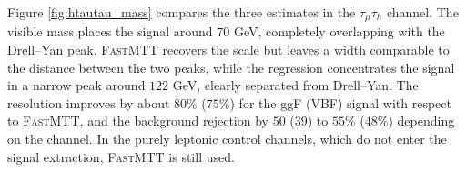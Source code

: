 Figure \ref{fig:htautau_mass} compares the three estimates in the $\tau_\mu\tau_h$ channel. The visible mass places the signal around $70$ GeV, completely overlapping with the Drell--Yan peak. \textsc{FastMTT} recovers the scale but leaves a width comparable to the distance between the two peaks, while the regression concentrates the signal in a narrow peak around $122$ GeV, clearly separated from Drell--Yan. The resolution improves by about $80\%$ ($75\%$) for the ggF (VBF) signal with respect to \textsc{FastMTT}, and the background rejection by $50$ ($39$) to $55\%$ ($48\%$) depending on the channel. In the purely leptonic control channels, which do not enter the signal extraction, \textsc{FastMTT} is still used.
%

